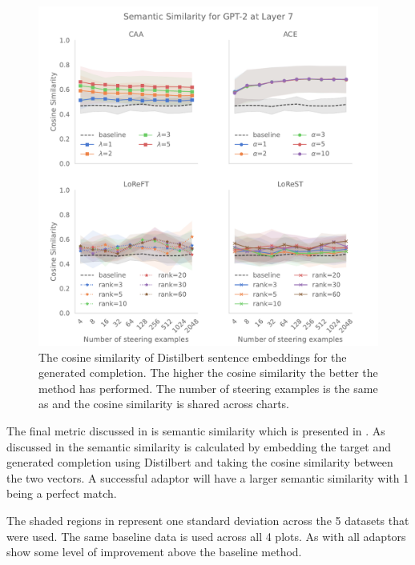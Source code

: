 \begin{figure}
    \centering
    \captionsetup{width=.9\textwidth}
    \includegraphics[width=\textwidth]{figures/gpt2_7_similarity.pdf}
    \caption{
        The cosine similarity of Distilbert \citep{distilbert} sentence embeddings for the generated completion.
        The higher the cosine similarity the better the method has performed.
        The number of steering examples is the same as  and the cosine similarity is shared across charts.
    }
    \label{fig:gpt-pp-sim} \end{figure}

The final metric discussed in  is semantic similarity which is presented in .
As discussed in  the semantic similarity is calculated by embedding the target and generated completion using Distilbert \citep{distilbert} and taking the cosine similarity between the two vectors.
A successful adaptor will have a larger semantic similarity with 1 being a perfect match.

The shaded regions in  represent one standard deviation across the 5 datasets that were used.
The same baseline data is used across all 4 plots.
As with  all adaptors show some level of improvement above the baseline method.

